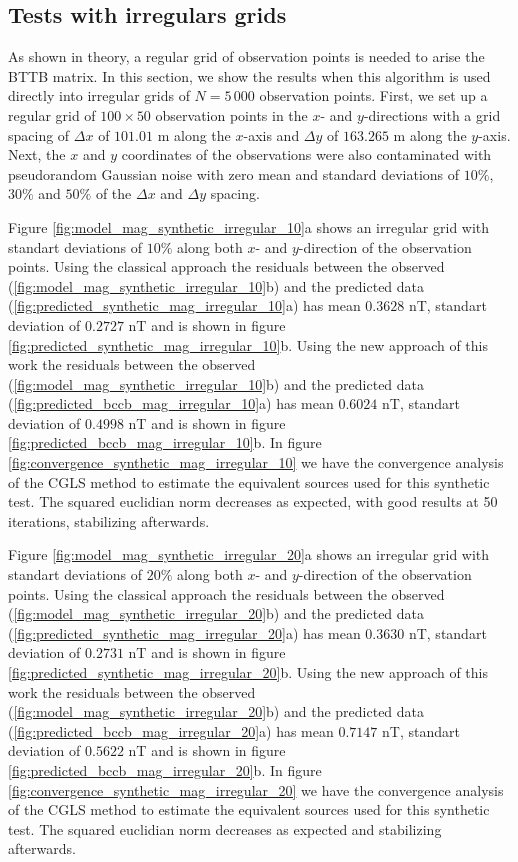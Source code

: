 \subsection*{Tests with irregulars grids}

As shown in theory, a regular grid of observation points is needed to arise the BTTB matrix. In this section, we show the results when this algorithm is used directly into irregular grids of $N = 5 \, 000$ observation points. 
First, we set up a regular grid of $100 \times 50$ observation points in the $x$- and $y$-directions with a grid spacing of $\Delta x$ of $101.01$ m along the $x$-axis and $\Delta y$ of
$163.265$ m along the $y$-axis. Next, the $x$ and $y$ coordinates of the observations were also contaminated with pseudorandom Gaussian noise with zero mean and standard deviations of $10\%$, $30\%$ and $50\%$ of the $\Delta x$ and $\Delta y$ spacing.

Figure \ref{fig:model_mag_synthetic_irregular_10}a shows an irregular grid with standart deviations of $10\%$ along both $x$- and $y$-direction of the observation points. Using the classical approach the residuals between the observed (\ref{fig:model_mag_synthetic_irregular_10}b) and the predicted data (\ref{fig:predicted_synthetic_mag_irregular_10}a) has mean $0.3628$ nT, standart deviation of $0.2727$ nT and is shown in figure \ref{fig:predicted_synthetic_mag_irregular_10}b. Using the new approach of this work the residuals between the observed (\ref{fig:model_mag_synthetic_irregular_10}b) and the predicted data (\ref{fig:predicted_bccb_mag_irregular_10}a) has mean $0.6024$ nT, standart deviation of $0.4998$ nT and is shown in figure \ref{fig:predicted_bccb_mag_irregular_10}b.
In figure \ref{fig:convergence_synthetic_mag_irregular_10} we have the convergence analysis of the CGLS method to estimate the equivalent sources used for this synthetic test. The squared euclidian norm decreases as expected, with good results at 50 iterations, stabilizing afterwards.

Figure \ref{fig:model_mag_synthetic_irregular_20}a shows an irregular grid with standart deviations of $20\%$ along both $x$- and $y$-direction of the observation points. Using the classical approach the residuals between the observed (\ref{fig:model_mag_synthetic_irregular_20}b) and the predicted data (\ref{fig:predicted_synthetic_mag_irregular_20}a) has mean $0.3630$ nT, standart deviation of $0.2731$ nT and is shown in figure \ref{fig:predicted_synthetic_mag_irregular_20}b. Using the new approach of this work the residuals between the observed (\ref{fig:model_mag_synthetic_irregular_20}b) and the predicted data (\ref{fig:predicted_bccb_mag_irregular_20}a) has mean $0.7147$ nT, standart deviation of $0.5622$ nT and is shown in figure \ref{fig:predicted_bccb_mag_irregular_20}b.
In figure \ref{fig:convergence_synthetic_mag_irregular_20} we have the convergence analysis of the CGLS method to estimate the equivalent sources used for this synthetic test. The squared euclidian norm decreases as expected and stabilizing afterwards.

